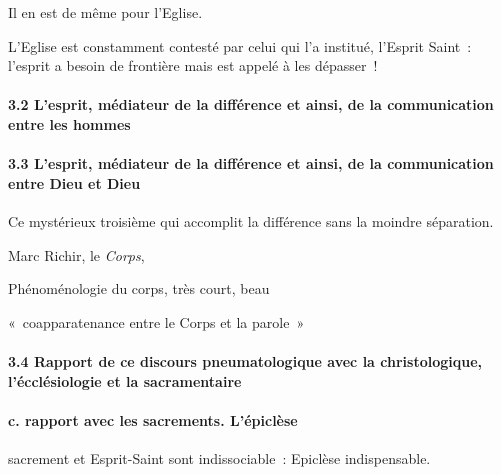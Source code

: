 Il en est de même pour l'Eglise.

L'Eglise est constamment contesté par celui qui l'a institué, l'Esprit
Saint~: l'esprit a besoin de frontière mais est appelé à les dépasser~!

\hypertarget{lesprit-muxe9diateur-de-la-diffuxe9rence-et-ainsi-de-la-communication-entre-les-hommes}{%
\paragraph{3.2 L'esprit, médiateur de la différence et ainsi, de la
communication entre les
hommes}\label{lesprit-muxe9diateur-de-la-diffuxe9rence-et-ainsi-de-la-communication-entre-les-hommes}}

\hypertarget{lesprit-muxe9diateur-de-la-diffuxe9rence-et-ainsi-de-la-communication-entre-dieu-et-dieu}{%
\paragraph{3.3 L'esprit, médiateur de la différence et ainsi, de la
communication entre Dieu et
Dieu}\label{lesprit-muxe9diateur-de-la-diffuxe9rence-et-ainsi-de-la-communication-entre-dieu-et-dieu}}

Ce mystérieux troisième qui accomplit la différence sans la moindre
séparation.

Marc Richir, le \emph{Corps},

Phénoménologie du corps, très court, beau

«~coapparatenance entre le Corps et la parole~»

\hypertarget{rapport-de-ce-discours-pneumatologique-avec-la-christologique-luxe9ccluxe9siologie-et-la-sacramentaire}{%
\paragraph{3.4 Rapport de ce discours pneumatologique avec la
christologique, l'écclésiologie et la
sacramentaire}\label{rapport-de-ce-discours-pneumatologique-avec-la-christologique-luxe9ccluxe9siologie-et-la-sacramentaire}}

\hypertarget{c.-rapport-avec-les-sacrements.-luxe9picluxe8se}{%
\paragraph{c. rapport avec les sacrements.
L'épiclèse}\label{c.-rapport-avec-les-sacrements.-luxe9picluxe8se}}

sacrement et Esprit-Saint sont indissociable~: Epiclèse indispensable.


